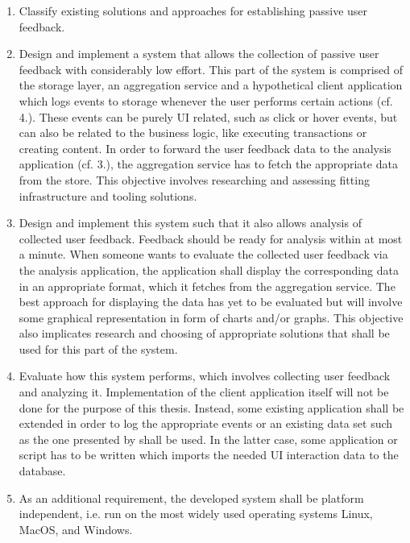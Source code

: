 \begin{enumerate}
\item Classify existing solutions and approaches for establishing passive user feedback.
\item Design and implement a system that allows the collection of passive user feedback with considerably low effort.
This part of the system is comprised of the storage layer, an aggregation service and a hypothetical client application which logs events to storage whenever the user performs certain actions (cf. 4.).
These events can be purely UI related, such as click or hover events, but can also be related to the business logic, like executing transactions or creating content.
In order to forward the user feedback data to the analysis application (cf. 3.), the aggregation service has to fetch the appropriate data from the store.
This objective involves researching and assessing fitting infrastructure and tooling solutions.
\item Design and implement this system such that it also allows analysis of collected user feedback.
Feedback should be ready for analysis within at most a minute.
When someone wants to evaluate the collected user feedback via the analysis application, the application shall display the corresponding data in an appropriate format, which it fetches from the aggregation service.
The best approach for displaying the data has yet to be evaluated but will involve some graphical representation in form of charts and/or graphs.
This objective also implicates research and choosing of appropriate solutions that shall be used for this part of the system.
\item Evaluate how this system performs, which involves collecting user feedback and analyzing it.
Implementation of the client application itself will not be done for the purpose of this thesis.
Instead, some existing application shall be extended in order to log the appropriate events or an existing data set such as the one presented by \citet{Deka:2017:Rico} shall be used.
In the latter case, some application or script has to be written which imports the needed UI interaction data to the database.
\item As an additional requirement, the developed system shall be platform independent, i.e. run on the most widely used operating systems Linux, MacOS, and Windows.
\end{enumerate}

